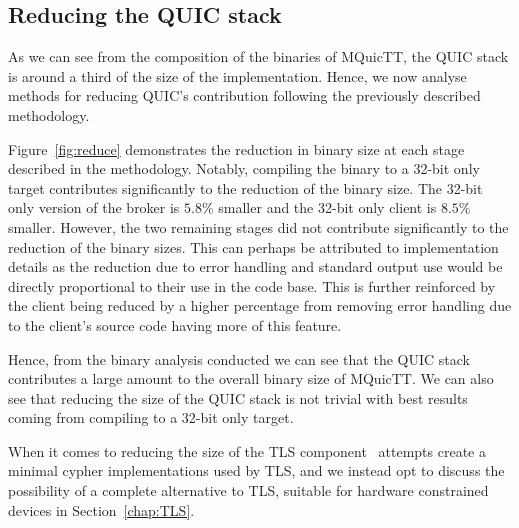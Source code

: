 \subsection{Reducing the QUIC stack}

As we can see from the composition of the binaries of MQuicTT, the QUIC stack is around a third of the size of the implementation.
Hence, we now analyse methods for reducing QUIC's contribution following the previously described methodology.

Figure~\ref{fig:reduce} demonstrates the reduction in binary size at each stage described in the methodology.
Notably, compiling the binary to a 32-bit only target contributes significantly to the reduction of the binary size.
The 32-bit only version of the broker is $5.8\%$ smaller and the 32-bit only client is $8.5\%$ smaller.
However, the two remaining stages did not contribute significantly to the reduction of the binary sizes.
This can perhaps be attributed to implementation details as the reduction due to error handling and standard output use would be directly proportional to their use in the code base.
This is further reinforced by the client being reduced by a higher percentage from removing error handling due to the client's source code having more of this feature.

Hence, from the binary analysis conducted we can see that the QUIC stack contributes a large amount to the overall binary size of MQuicTT.
We can also see that reducing the size of the QUIC stack is not trivial with best results coming from compiling to a 32-bit only target.

When it comes to reducing the size of the TLS component~\cite{eggert_towards_2020} attempts create a minimal cypher implementations used by TLS, and we instead opt to discuss the possibility of a complete alternative to TLS, suitable for hardware constrained devices in Section~\ref{chap:TLS}.
